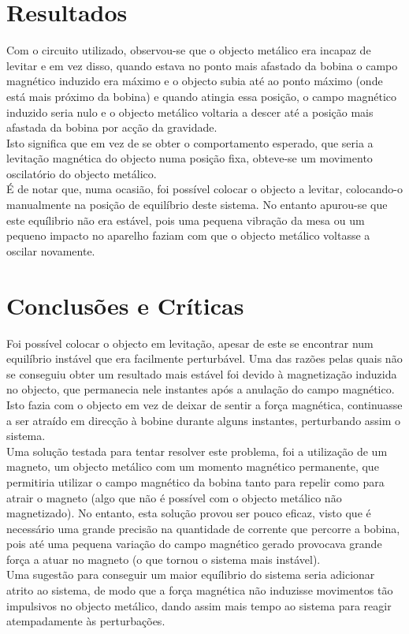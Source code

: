 \documentclass[%
  reprint,
  nofootinbib,
  amsmath,amssymb,
  aps,
  10pt,
  a4paper
]{revtex4-1}
\begin{document}
\section{Resultados}
\label{s:resul}
Com o circuito utilizado, observou-se que o objecto metálico era incapaz de levitar e em vez disso, quando estava no ponto mais afastado da bobina o campo magnético induzido era máximo e o objecto subia até ao ponto máximo (onde está mais próximo da bobina) e quando atingia essa posição, o campo magnético induzido seria nulo e o objecto metálico voltaria a descer até a posição mais afastada da bobina por acção da gravidade.\\
Isto significa que em vez de se obter o comportamento esperado, que seria a levitação magnética do objecto numa posição fixa, obteve-se um movimento oscilatório do objecto metálico.\\
É de notar que, numa ocasião, foi possível colocar o objecto a levitar, colocando-o manualmente na posição de equilíbrio deste sistema. No entanto apurou-se que este equílibrio não era estável, pois uma pequena vibração da mesa ou um pequeno impacto no aparelho faziam com que o objecto metálico voltasse a oscilar novamente.\\




\section{Conclusões e Críticas}
\label{s:conclu}
Foi possível colocar o objecto em levitação, apesar de este se encontrar num equilíbrio instável que era facilmente perturbável. Uma das razões pelas quais não se conseguiu obter um resultado mais estável foi devido à magnetização induzida no objecto, que permanecia nele instantes após a anulação do campo magnético. Isto fazia com o objecto em vez de deixar de sentir a força magnética, continuasse a ser atraído em direcção à bobine durante alguns instantes, perturbando assim o sistema.\\
Uma solução testada para tentar resolver este problema, foi a utilização de um magneto, um objecto metálico com um momento magnético permanente, que permitiria utilizar o campo magnético da bobina tanto para repelir como para atrair o magneto (algo que não é possível com o objecto metálico não magnetizado). No entanto, esta solução provou ser pouco eficaz, visto que é necessário uma grande precisão na quantidade de corrente que percorre a bobina, pois até uma pequena variação do campo magnético gerado provocava grande força a atuar no magneto (o que tornou o sistema mais instável).\\
Uma sugestão para conseguir um maior equílibrio do sistema seria adicionar atrito ao sistema, de modo que a força magnética não induzisse movimentos tão impulsivos no objecto metálico, dando assim mais tempo ao sistema para reagir atempadamente às perturbações.
\end{document}
